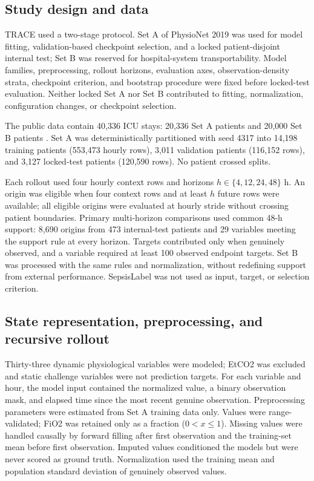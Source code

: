 \documentclass[preprint,12pt]{elsarticle}
\begin{document}
\subsection{Study design and data}

TRACE used a two-stage protocol. Set A of PhysioNet 2019 was used for model fitting, validation-based checkpoint selection, and a locked patient-disjoint internal test; Set B was reserved for hospital-system transportability. Model families, preprocessing, rollout horizons, evaluation axes, observation-density strata, checkpoint criterion, and bootstrap procedure were fixed before locked-test evaluation. Neither locked Set A nor Set B contributed to fitting, normalization, configuration changes, or checkpoint selection.

The public data contain 40,336 ICU stays: 20,336 Set A patients and 20,000 Set B patients \cite{reyna2020sepsis}. Set A was deterministically partitioned with seed 4317 into 14,198 training patients (553,473 hourly rows), 3,011 validation patients (116,152 rows), and 3,127 locked-test patients (120,590 rows). No patient crossed splits.

Each rollout used four hourly context rows and horizons $h\in\{4,12,24,48\}$ h. An origin was eligible when four context rows and at least $h$ future rows were available; all eligible origins were evaluated at hourly stride without crossing patient boundaries. Primary multi-horizon comparisons used common 48-h support: 8,690 origins from 473 internal-test patients and 29 variables meeting the support rule at every horizon. Targets contributed only when genuinely observed, and a variable required at least 100 observed endpoint targets. Set B was processed with the same rules and normalization, without redefining support from external performance. SepsisLabel was not used as input, target, or selection criterion.

\subsection{State representation, preprocessing, and recursive rollout}

Thirty-three dynamic physiological variables were modeled; EtCO2 was excluded and static challenge variables were not prediction targets. For each variable and hour, the model input contained the normalized value, a binary observation mask, and elapsed time since the most recent genuine observation. Preprocessing parameters were estimated from Set A training data only. Values were range-validated; FiO2 was retained only as a fraction ($0<x\leq1$). Missing values were handled causally by forward filling after first observation and the training-set mean before first observation. Imputed values conditioned the models but were never scored as ground truth. Normalization used the training mean and population standard deviation of genuinely observed values.
\end{document}

